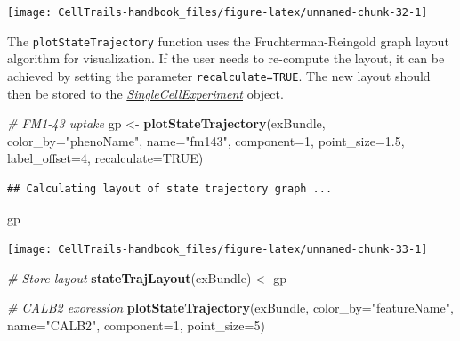 \documentclass[]{book}
\newenvironment{Shaded}{\begin{snugshade}}{\end{snugshade}}
\newcommand{\KeywordTok}[1]{\textcolor[rgb]{0.13,0.29,0.53}{\textbf{#1}}}
\newcommand{\DataTypeTok}[1]{\textcolor[rgb]{0.13,0.29,0.53}{#1}}
\newcommand{\DecValTok}[1]{\textcolor[rgb]{0.00,0.00,0.81}{#1}}
\newcommand{\FloatTok}[1]{\textcolor[rgb]{0.00,0.00,0.81}{#1}}
\newcommand{\StringTok}[1]{\textcolor[rgb]{0.31,0.60,0.02}{#1}}
\newcommand{\CommentTok}[1]{\textcolor[rgb]{0.56,0.35,0.01}{\textit{#1}}}
\newcommand{\OtherTok}[1]{\textcolor[rgb]{0.56,0.35,0.01}{#1}}
\newcommand{\NormalTok}[1]{#1}
\theoremstyle{definition}
\theoremstyle{definition}
\theoremstyle{definition}
\theoremstyle{remark}
\begin{document}
\texttt{[image: CellTrails-handbook\_files/figure-latex/unnamed-chunk-32-1]}

The \texttt{plotStateTrajectory} function uses the Fruchterman-Reingold
graph layout algorithm \citep{fr} for visualization. If the user needs
to re-compute the layout, it can be achieved by setting the parameter
\texttt{recalculate=TRUE}. The new layout should then be stored to the
\emph{\href{http://bioconductor.org/packages/SingleCellExperiment}{SingleCellExperiment}}
object.

\begin{Shaded}
\begin{Highlighting}[]
\CommentTok{# FM1-43 uptake}
\NormalTok{gp <-}\StringTok{ }\KeywordTok{plotStateTrajectory}\NormalTok{(exBundle, }\DataTypeTok{color_by=}\StringTok{"phenoName"}\NormalTok{, }\DataTypeTok{name=}\StringTok{"fm143"}\NormalTok{, }
                          \DataTypeTok{component=}\DecValTok{1}\NormalTok{, }\DataTypeTok{point_size=}\FloatTok{1.5}\NormalTok{, }\DataTypeTok{label_offset=}\DecValTok{4}\NormalTok{, }
                          \DataTypeTok{recalculate=}\OtherTok{TRUE}\NormalTok{)}
\end{Highlighting}
\end{Shaded}

\begin{verbatim}
## Calculating layout of state trajectory graph ...
\end{verbatim}

\begin{Shaded}
\begin{Highlighting}[]
\NormalTok{gp}
\end{Highlighting}
\end{Shaded}

\texttt{[image: CellTrails-handbook\_files/figure-latex/unnamed-chunk-33-1]}

\begin{Shaded}
\begin{Highlighting}[]
\CommentTok{# Store layout}
\KeywordTok{stateTrajLayout}\NormalTok{(exBundle) <-}\StringTok{ }\NormalTok{gp}

\CommentTok{# CALB2 exoression}
\KeywordTok{plotStateTrajectory}\NormalTok{(exBundle, }\DataTypeTok{color_by=}\StringTok{"featureName"}\NormalTok{, }\DataTypeTok{name=}\StringTok{"CALB2"}\NormalTok{, }
                    \DataTypeTok{component=}\DecValTok{1}\NormalTok{, }\DataTypeTok{point_size=}\DecValTok{5}\NormalTok{)}
\end{Highlighting}
\end{Shaded}
\end{document}
